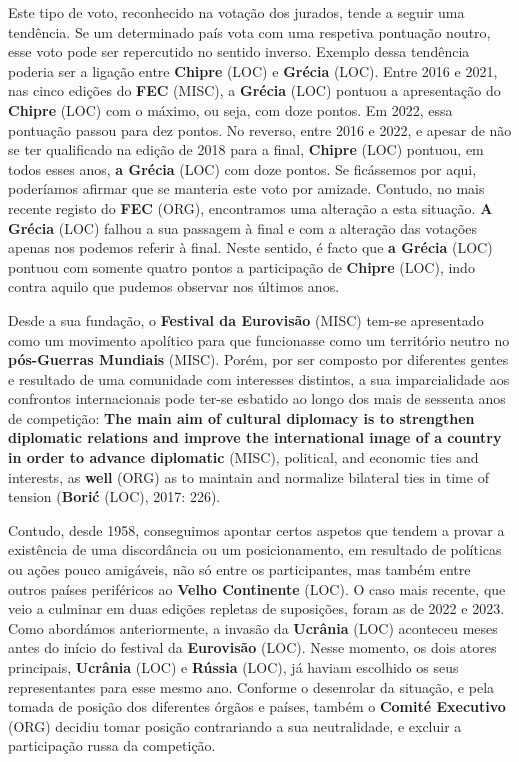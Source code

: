 \documentclass[12pt,a4paper]{article}
\begin{document}
Este tipo de voto, reconhecido na votação dos jurados, tende a seguir uma tendência. Se um  determinado  país  vota  com  uma  respetiva  pontuação  noutro,  esse  voto  pode  ser repercutido  no  sentido  inverso.  Exemplo  dessa  tendência  poderia  ser  a  ligação  entre \textbf{Chipre} (LOC)  e  \textbf{Grécia} (LOC).  Entre  2016  e  2021,  nas  cinco  edições  do  \textbf{FEC} (MISC),  a  \textbf{Grécia} (LOC)  pontuou  a apresentação  do  \textbf{Chipre} (LOC)  com  o  máximo,  ou  seja,  com  doze  pontos.  Em  2022,  essa pontuação passou para dez pontos. No reverso, entre 2016 e 2022, e apesar de não se ter qualificado na edição de 2018 para a final, \textbf{Chipre} (LOC) pontuou, em todos esses anos, \textbf{a Grécia} (LOC) com doze pontos. Se ficássemos por aqui, poderíamos afirmar que se manteria este voto por amizade. Contudo, no mais recente registo do \textbf{FEC} (ORG), encontramos uma alteração a esta situação. \textbf{A Grécia} (LOC) falhou a sua passagem à final e com a alteração das votações apenas nos podemos referir à final.  Neste sentido, é facto que \textbf{a Grécia} (LOC) pontuou  com somente quatro  pontos  a  participação  de  \textbf{Chipre} (LOC),  indo  contra  aquilo  que  pudemos  observar  nos últimos anos.

Desde  a  sua  fundação,  o  \textbf{Festival  da  Eurovisão} (MISC)  tem-se  apresentado  como  um movimento  apolítico  para  que  funcionasse  como  um  território  neutro  no  \textbf{pós-Guerras Mundiais} (MISC). Porém, por ser composto por diferentes gentes e resultado de uma comunidade com interesses distintos, a sua imparcialidade aos confrontos internacionais pode ter-se esbatido ao longo dos mais de sessenta anos de competição: \textbf{The main aim of cultural diplomacy is to strengthen diplomatic relations and improve the international image of a country in order to advance diplomatic} (MISC), political, and economic ties and interests, as \textbf{well} (ORG) as to maintain and normalize bilateral ties in time of tension (\textbf{Borić} (LOC), 2017: 226).

Contudo, desde 1958, conseguimos apontar certos aspetos que tendem a provar a existência de uma discordância ou um posicionamento, em resultado de políticas ou ações pouco  amigáveis,  não  só  entre  os  participantes,  mas  também  entre  outros  países periféricos  ao  \textbf{Velho  Continente} (LOC).  O  caso  mais  recente,  que  veio  a  culminar  em  duas edições repletas de suposições, foram as de 2022 e 2023. Como abordámos anteriormente, a invasão da \textbf{Ucrânia} (LOC)  aconteceu  meses  antes do  início do festival  da \textbf{Eurovisão} (LOC). Nesse momento,  os  dois  atores  principais,  \textbf{Ucrânia} (LOC)  e  \textbf{Rússia} (LOC),  já  haviam  escolhido  os  seus representantes para esse mesmo ano. Conforme o desenrolar da situação, e pela tomada de  posição  dos  diferentes  órgãos  e  países,  também  o  \textbf{Comité  Executivo} (ORG)  decidiu  tomar posição  contrariando  a  sua  neutralidade,  e  excluir  a  participação  russa  da  competição.
\end{document}
